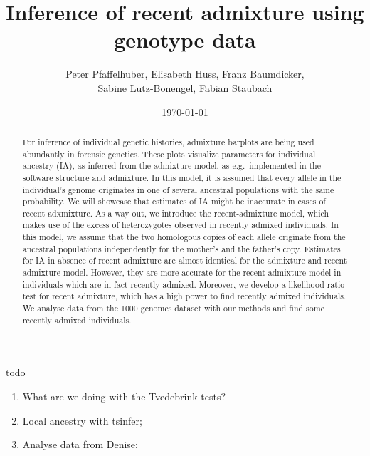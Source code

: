 \documentclass[12pt]{article}
\theoremstyle{definition}
\begin{document}
\title{\LARGE Inference of recent admixture using genotype data}

\author{\sc Peter Pfaffelhuber, Elisabeth Huss, Franz Baumdicker, \\
  \sc Sabine Lutz-Bonengel, Fabian Staubach}

\date{\today}

\maketitle

{\color{blue}
{\sc todo}
\begin{enumerate}
\item What are we doing with the Tvedebrink-tests?
\item Local ancestry with tsinfer;
\item Analyse data from Denise;
\end{enumerate}
}

\begin{abstract}
  \noindent
  For inference of individual genetic histories, admixture barplots
  are being used abundantly in forensic genetics. These plots
  visualize parameters for individual ancestry (IA), as inferred from
  the admixture-model, as e.g.\ implemented in the software {\sc
    structure} and {\sc admixture}. In this model, it is assumed that
  every allele in the individual's genome originates in one of several
  ancestral populations with the same probability. We will showcase
  that estimates of IA might be inaccurate in cases of recent
  adxmixture. As a way out, we introduce the recent-admixture model,
  which makes use of the excess of heterozygotes observed in recently
  admixed individuals. In this model, we assume that the two
  homologous copies of each allele originate from the ancestral
  populations independently for the mother's and the father's
  copy. Estimates for IA in absence of recent admixture are almost
  identical for the admixture and recent admixture model. However,
  they are more accurate for the recent-admixture model in individuals
  which are in fact recently admixed. Moreover, we develop a
  likelihood ratio test for recent admixture, which has a high power
  to find recently admixed individuals. We analyse data from the 1000
  genomes dataset with our methods and find some recently admixed
  individuals.
\end{abstract}
\end{document}

